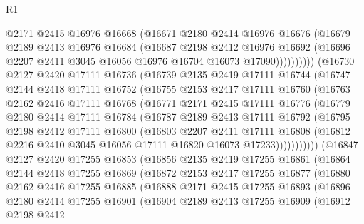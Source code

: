 \begin{lexlean}{R1}
\begin{coremodule}
                @2171
                @2415
                @16976
                @16668
                (@16671
                  @2180
                  @2414
                  @16976
                  @16676
                  (@16679
                    @2189
                    @2413
                    @16976
                    @16684
                    (@16687
                      @2198
                      @2412
                      @16976
                      @16692
                      (@16696 @2207 @2411 @3045 @16056 @16976 @16704 @16073 @17090))))))))))
    (@16730
      @2127
      @2420
      @17111
      @16736
      (@16739
        @2135
        @2419
        @17111
        @16744
        (@16747
          @2144
          @2418
          @17111
          @16752
          (@16755
            @2153
            @2417
            @17111
            @16760
            (@16763
              @2162
              @2416
              @17111
              @16768
              (@16771
                @2171
                @2415
                @17111
                @16776
                (@16779
                  @2180
                  @2414
                  @17111
                  @16784
                  (@16787
                    @2189
                    @2413
                    @17111
                    @16792
                    (@16795
                      @2198
                      @2412
                      @17111
                      @16800
                      (@16803
                        @2207
                        @2411
                        @17111
                        @16808
                        (@16812 @2216 @2410 @3045 @16056 @17111 @16820 @16073 @17233)))))))))))
    (@16847
      @2127
      @2420
      @17255
      @16853
      (@16856
        @2135
        @2419
        @17255
        @16861
        (@16864
          @2144
          @2418
          @17255
          @16869
          (@16872
            @2153
            @2417
            @17255
            @16877
            (@16880
              @2162
              @2416
              @17255
              @16885
              (@16888
                @2171
                @2415
                @17255
                @16893
                (@16896
                  @2180
                  @2414
                  @17255
                  @16901
                  (@16904
                    @2189
                    @2413
                    @17255
                    @16909
                    (@16912
                      @2198
                      @2412

\end{coremodule}
\end{lexlean}
